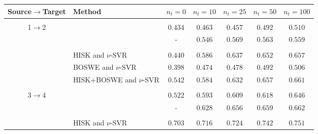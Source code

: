 \documentclass[11pt,a4paper]{article}
\begin{document}
\begin{table*}[!t]
\setlength\tabcolsep{4.5pt}
\begin{center}
\begin{tabular}{clccccc}
\hline
Source$\rightarrow$Target & Method 														& $n_t=0$					&	$n_t=10$					
																				&	$n_t=25$				& $n_t=50$					& $n_t=100$\\
\hline
\hline
\vspace{-0.9em}\\
1$\rightarrow$2					& \cite{Phandi-EMNLP-2015}							& $0.434$ 					& $0.463$ 				
																				& $0.457$ 					& $0.492$					& $0.510$\\
																				
											& \cite{Dong-EMNLP-2016}								& - 								& $0.546$ 				
																				& $0.569$ 					& $0.563$					& $0.559$\\
\cline{2-7}
\vspace{-0.9em}\\

											& HISK and $\nu$-SVR										& $0.440$ 					& $\mathbf{0.586}$ 				
																				& $\mathbf{0.637}$ 	& $0.652$					& $0.657$\\

											& BOSWE and $\nu$-SVR								& $0.398$ 					& $0.474$ 				
																				& $0.478$ 					& $0.492$					& $0.506$\\

											& HISK+BOSWE and $\nu$-SVR						& $\mathbf{0.542}$ 	& $0.584$ 				
																				& $0.632$ 					& $\mathbf{0.657}$	& $\mathbf{0.661}$\\
\hline
\vspace{-0.9em}\\
3$\rightarrow$4					& \cite{Phandi-EMNLP-2015}							& $0.522$ 					& $0.593$ 				
																				& $0.609$ 					& $0.618$					& $0.646$\\
																				
											& \cite{Dong-EMNLP-2016}								& - 								& $0.628$ 				
																				& $0.656$ 					& $0.659$					& $0.662$\\
\cline{2-7}
\vspace{-0.9em}\\

											& HISK and $\nu$-SVR										& $\mathbf{0.703}$ 	& $\mathbf{0.716}$ 				
																				& $0.724$ 					& $0.742$					& $0.751$\\


\end{tabular}
\end{center}
\end{table*}
\end{document}
